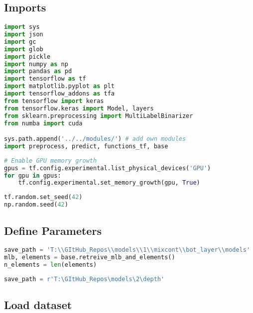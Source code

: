 \hypertarget{imports}{%
\subsection*{Imports}\label{imports}}

\begin{lstlisting}[language=Python]
import sys
import json
import gc
import glob
import pickle
import numpy as np
import pandas as pd
import tensorflow as tf
import matplotlib.pyplot as plt
import tensorflow_addons as tfa
from tensorflow import keras
from tensorflow.keras import Model, layers
from sklearn.preprocessing import MultiLabelBinarizer
from numba import cuda

sys.path.append('../../modules/') # add own modules
import preprocess, predict, functions_tf, base
\end{lstlisting}

\begin{lstlisting}[language=Python]
# Enable GPU memory growth
gpus = tf.config.experimental.list_physical_devices('GPU')
for gpu in gpus:
    tf.config.experimental.set_memory_growth(gpu, True)
\end{lstlisting}

\begin{lstlisting}[language=Python]
tf.random.set_seed(42)
np.random.seed(42)
\end{lstlisting}

\hypertarget{define-parameters}{%
\subsection*{Define Parameters}\label{define-parameters}}

\begin{lstlisting}[language=Python]
save_path = 'T:\\GItHub_Repos\\models\\1\\mixcont\\bot_layer\\models'
mlb, elements = base.retreive_mlb_and_elements()
n_elements = len(elements)
\end{lstlisting}

\begin{lstlisting}[language=Python]
save_path = r'T:\GItHub_Repos\models\2\depth'
\end{lstlisting}

\hypertarget{load-dataset}{%
\subsection*{Load dataset}\label{load-dataset}}

